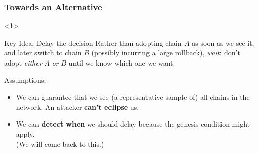 \documentclass[usenames,dvipsnames,t]{beamer}
\begin{document}
\begin{frame}
\frametitle{Towards an Alternative}

\begin{onlyenv}<1>

\begin{alertblock}{Key Idea: Delay the decision}
Rather than adopting chain $A$ as soon as we see it,
and later switch to chain $B$ (possibly incurring a large rollback), \emph{wait}:
don't adopt \emph{either} $A$ \emph{or} $B$ until we know which one we want.
\end{alertblock}

Assumptions:

\begin{itemize}
\item We can guarantee that we see (a representative sample of) all chains
in the network. An attacker \textbf{can't eclipse} us.
\item We can \textbf{detect when} we should delay because the genesis condition
might apply. \\
(We will come back to this.) \\
\end{itemize}

\end{onlyenv}

\end{frame}

\end{document}
